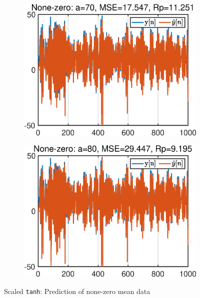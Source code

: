 \begin{figure}[htb]
\begin{subfigure}[b]{0.33\textwidth}
         \includegraphics[width=\textwidth]{fig/4/43b5.eps}
     \end{subfigure}
    \hspace{-0.2cm}
     \begin{subfigure}[b]{0.33\textwidth}
         \centering
         \includegraphics[width=\textwidth]{fig/4/43b6.eps}
     \end{subfigure}
       \caption{Scaled \texttt{tanh}: Prediction of none-zero mean data}
        \label{fig:4_3_b}
\end{figure}
